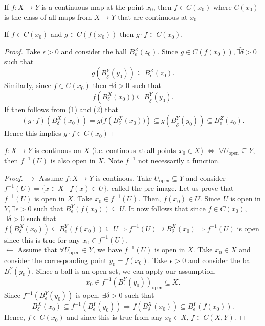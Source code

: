 \documentclass[a4paper]{article}
\begin{document}
 \begin{definition}
   If $f: X \to Y$  is a continuous map at the point $x_0$, then $f \in C(x_0)$ where $C(x_0)$ is the class of all maps from  $X \to Y$ that are continuous at $x_0$
\end{definition}

 \begin{theorem}
If $f \in C(x_0)$ and  $g \in C(f(x_0))$ then $g \cdot f \in C(x_0)$.   

\begin{proof}
  Take $\epsilon > 0$ and consider the ball  $B_{\epsilon}^{Z} (z_0)$. Since $g \in C(f(x_0)), \exists \tilde{\delta} > 0$ such that 
  \[
    g\left( B_{\tilde{\delta}}^{Y} (y_0) \right) \subseteq B_{\epsilon}^{Z} (z_0)  
  .\] Similarly, since $f \in C(x_0)$ then  $\exists \delta > 0$ such that
  \[
  f\left( B_{\delta}^{X} (x_0) ) \subseteq B_{\tilde{\delta}}^{Y} (y_0) 
  .\] 
  If then follows from (1) and (2) that 
  \[
    \left( g \cdot f \right) \left( B_{\delta}^{X} (x_0) \right) = g(f\left( B_{\delta}^{X} \left( x_0 \right) ) \right) \subseteq   g\left( B_{\tilde{\delta}}^{Y} (y_0) \right) \subseteq B_{\epsilon}^{Z} (z_0)  
  .\]
  Hence this implies $g \cdot f \in C(x_0)$
\end{proof}
 \end{theorem}

\begin{theorem}
  $f: X \to Y$ is continous on $X$ (i.e. continous at all points $x_0 \in X$) $\iff$ $\forall U_{\text{open}} \subseteq Y$, then $f^{-1}(U)$ is also open in $X$. Note  $f^{-1}$ not necessarily a function.

  \begin{proof}
    $\to$ Assume  $f: X \to Y$ is continous. Take $U_{\text{open}} \subseteq Y$ and consider $f^{-1}(U) = \{x \in X \mid f(x) \in U\} $, called the pre-image. Let us prove that $f^{-1}(U)$ is open in $X$. Take  $x_0 \in f^{-1}(U)$. Then, $f(x_0) \in U$. Since $U$ is open in $Y, \exists \epsilon > 0$ such that $B_{\epsilon}^{Y} (f(x_0)) \subseteq U$. It now follows that since $f \in C(x_0)$,  $\exists \delta > 0$ such that $f(B_{\delta}^{X} (x_0))\subseteq B_{\epsilon}^{Y} (f(x_0)) \subseteq U \Rightarrow f^{-1}(U) \supseteq B_{\delta}^{X}(x_0) \Rightarrow f^{-1}(U)$ is open since this is true for any $x_0 \in f^{-1}(U)$. \\


    $\leftarrow$ Assume that $\forall U_{\text{open}} \in Y$, we have $f^{-1}(U)$ is open in $X$. Take $x_0 \in X$ and consider the corresponding point  $y_0 = f(x_0)$. Take $\epsilon > 0$ and consider the ball $B_{\epsilon}^{Y}(y_0)$. Since a ball is an open set, we can apply our assumption,
     \[
       x_0 \in f^{-1}(B_{\epsilon}^{Y} (y_0))_{\text{open}} \subseteq X
     .\] 
Since $f^{-1}(B_{\epsilon}^{Y} (y_0))$ is open, $\exists \delta > 0$ such that 
\[
B_{\delta}^{X} (x_0) \subseteq f^{-1}(B_{\epsilon}^{Y} (y_0)) \Rightarrow f(B_{\delta}^{X} (x_0)) \subseteq B_{\epsilon}^{Y} (f(x_0))
.\]
Hence, $f \in C(x_0)$ and since this is true from any  $x_0 \in X$, $f \in C(X,Y)$.
  \end{proof}
 \end{theorem}
\end{document}
